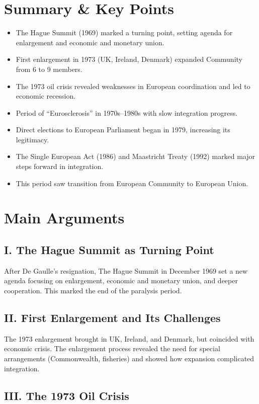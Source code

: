 \documentclass[11pt,a4paper]{article}
\begin{document}
\section*{Summary \& Key Points}

\begin{itemize}
\item The Hague Summit (1969) marked a turning point, setting agenda for enlargement and economic and monetary union.
\item First enlargement in 1973 (UK, Ireland, Denmark) expanded Community from 6 to 9 members.
\item The 1973 oil crisis revealed weaknesses in European coordination and led to economic recession.
\item Period of ``Eurosclerosis'' in 1970s--1980s with slow integration progress.
\item Direct elections to European Parliament began in 1979, increasing its legitimacy.
\item The Single European Act (1986) and Maastricht Treaty (1992) marked major steps forward in integration.
\item This period saw transition from European Community to European Union.
\end{itemize}

\section*{Main Arguments}

\subsection*{I. The Hague Summit as Turning Point}

After De Gaulle's resignation, The Hague Summit in December 1969 set a new agenda focusing on enlargement, economic and monetary union, and deeper cooperation. This marked the end of the paralysis period.

\subsection*{II. First Enlargement and Its Challenges}

The 1973 enlargement brought in UK, Ireland, and Denmark, but coincided with economic crisis. The enlargement process revealed the need for special arrangements (Commonwealth, fisheries) and showed how expansion complicated integration.

\subsection*{III. The 1973 Oil Crisis}
\end{document}
